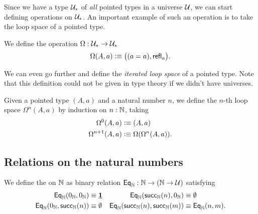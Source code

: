 Since we have a type $\mathcal{U}_\ast$ of \emph{all} pointed types in a universe $\mathcal{U}$, we can start defining operations on $\mathcal{U}_\ast$. An important example of such an operation is to take the loop space of a pointed type.

\begin{defn}
  We define the  operation $\Omega : \mathcal{U}_\ast \to \mathcal{U}_\ast$
  \begin{equation*}
    \Omega(A,a)\vcentcolon\equiv \big((a=a),\mathsf{refl}_{a}\big).
  \end{equation*}
\end{defn}

We can even go further and define the \emph{iterated loop space} of a pointed type. Note that this definition could not be given in type theory if we didn't have universes.

\begin{defn}
  Given a pointed type $(A,a)$ and a natural number $n$, we define the $n$-th loop space $\Omega^n(A,a)$ by induction on $n:{\mathbb{N}}$, taking
  \begin{align*}
    \Omega^0(A,a) & \vcentcolon\equiv (A,a) \\
    \Omega^{n+1}(A,a) & \vcentcolon\equiv \Omega(\Omega^n(A,a)).
  \end{align*}
\end{defn}

\subsection{Relations on the natural numbers}

\begin{defn}\label{defn:obs_nat}
We define the  on ${\mathbb{N}}$ as binary relation $\mathsf{Eq}_{{\mathbb{N}}}:{\mathbb{N}}\to({\mathbb{N}}\to\mathcal{U})$ satisfying
\begin{align*}
\mathsf{Eq}_{{\mathbb{N}}}(0_{{\mathbb{N}}},0_{{\mathbb{N}}}) & \equiv \underline{\mathbf{1}} & \mathsf{Eq}_{{\mathbb{N}}}(\mathsf{succ}_{{\mathbb{N}}}(n),0_{{\mathbb{N}}}) & \equiv \emptyset \\
\mathsf{Eq}_{{\mathbb{N}}}(0_{{\mathbb{N}}},\mathsf{succ}_{{\mathbb{N}}}(n)) & \equiv \emptyset & \mathsf{Eq}_{{\mathbb{N}}}(\mathsf{succ}_{{\mathbb{N}}}(n),\mathsf{succ}_{{\mathbb{N}}}(m)) & \equiv \mathsf{Eq}_{{\mathbb{N}}}(n,m).
\end{align*}
\end{defn}

